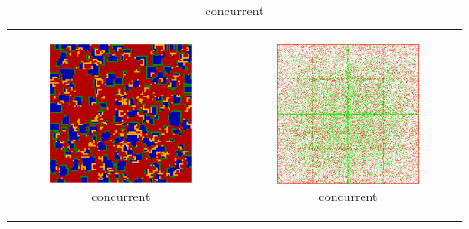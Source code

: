 \begin{table}
\begin{tabular}{c c}
		\begin{subfigure}[b]{0.4\textwidth}
			\centering
			\includegraphics[width=.7\textwidth, angle=0]{./fig/con_SG_436steps_java.png}
			\caption{concurrent}
			\label{fig:pd_con}
		\end{subfigure}
    	&
		\begin{subfigure}[b]{0.4\textwidth}
			\centering
			\includegraphics[width=.7\textwidth, angle=0]{./fig/con_HAC_100_000_500steps_java.png}
			\caption{concurrent}
			\label{fig:hac_con}
		\end{subfigure}
    	\\ 
    	
		

\end{tabular}
\end{table}
